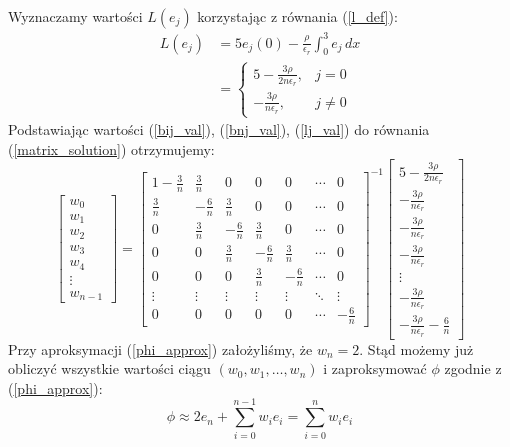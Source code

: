 \documentclass[a4paper,12pt]{article}
\begin{document}
    Wyznaczamy wartości \(L(e_j)\) korzystając z równania (\ref{l_def}):
    \begin{align}
        L(e_j) &= 5e_j(0) - \frac{\rho}{\epsilon_r} \int_{0}^{3} e_j\,dx \nonumber \\
        &=
        \begin{cases}
            5 - \frac{3\rho}{2n\epsilon_r},& j = 0 \\
            -\frac{3\rho}{n\epsilon_r},& j \neq 0
        \end{cases} \label{lj_val}
    \end{align}
    Podstawiając wartości (\ref{bij_val}), (\ref{bnj_val}), (\ref{lj_val}) do równania (\ref{matrix_solution}) otrzymujemy:
    \begin{equation}
        \begin{bmatrix}
            w_0 \\
            w_1 \\
            w_2 \\
            w_3 \\
            w_4 \\
            \vdots \\
            w_{n-1}
        \end{bmatrix}
        =
        \begin{bmatrix}
            1-\frac{3}{n} &  \frac{3}{n} &  0 &  0 &  0 & \cdots &  0 \\
            \frac{3}{n} & -\frac{6}{n} &  \frac{3}{n} &  0 &  0 & \cdots &  0 \\
            0 &  \frac{3}{n} & -\frac{6}{n} &  \frac{3}{n} &  0 & \cdots &  0 \\
            0 &  0 &  \frac{3}{n} & -\frac{6}{n} &  \frac{3}{n} & \cdots &  0 \\
            0 &  0 &  0 &  \frac{3}{n} & -\frac{6}{n} & \cdots &  0 \\
            \vdots & \vdots & \vdots & \vdots & \vdots & \ddots & \vdots \\
            0 &  0 &  0 &  0 &  0 & \cdots & -\frac{6}{n}
        \end{bmatrix}
        ^{-1}
        \begin{bmatrix}
            5 - \frac{3\rho}{2n\epsilon_r} \\
            -\frac{3\rho}{n\epsilon_r} \\
            -\frac{3\rho}{n\epsilon_r} \\
            -\frac{3\rho}{n\epsilon_r} \\
            \vdots \\
            -\frac{3\rho}{n\epsilon_r} \\
            -\frac{3\rho}{n\epsilon_r}-\frac{6}{n}
        \end{bmatrix} \label{matrix_nums}
    \end{equation}
    Przy aproksymacji (\ref{phi_approx}) założyliśmy, że \(w_n = 2\). Stąd możemy już obliczyć wszystkie wartości ciągu \((w_0, w_1, \ldots, w_n)\) i zaproksymować \(\phi\) zgodnie z (\ref{phi_approx}):
    \begin{equation}
        \phi \approx 2e_n + \sum_{i=0}^{n-1} w_i e_i = \sum_{i=0}^{n} w_i e_i
    \end{equation}
\end{document}
